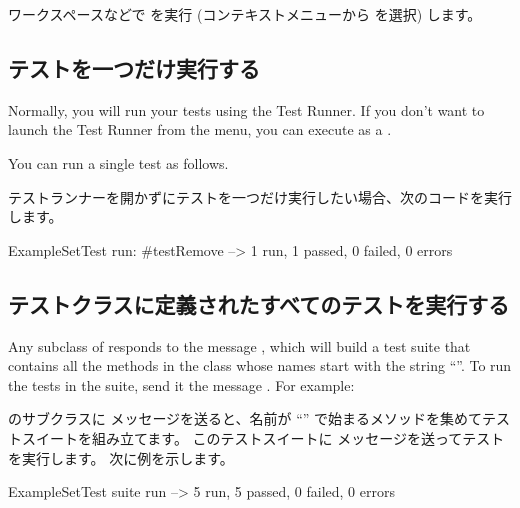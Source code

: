 \documentclass[a4paper,10pt,twoside]{book}
\begin{document}
ワークスペースなどで  を実行 (コンテキストメニューから  を選択) します。



\subsection{テストを一つだけ実行する}

Normally, you will run your tests using the Test Runner.
If you don't want to launch the Test Runner from the  menu, you can execute  as a .

You can run a single test as follows.
\fi

テストランナーを開かずにテストを一つだけ実行したい場合、次のコードを実行します。

\begin{code}{}
ExampleSetTest run: #testRemove --> 1 run, 1 passed, 0 failed, 0 errors
\end{code}

\subsection{テストクラスに定義されたすべてのテストを実行する}

Any subclass of  responds to the message , which will build a test suite that contains all the
methods in the class whose names start with the string ``''.
To run the tests in the suite, send it the message .
For example:
\fi

 のサブクラスに  メッセージを送ると、名前が ``'' で始まるメソッドを集めてテストスイートを組み立てます。
このテストスイートに  メッセージを送ってテストを実行します。
次に例を示します。

\begin{code}{}
ExampleSetTest suite run --> 5 run, 5 passed, 0 failed, 0 errors
\end{code}
\end{document}
